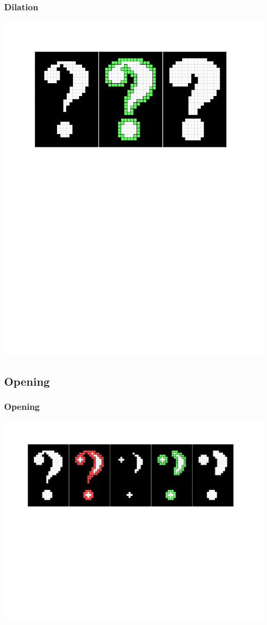 \documentclass{beamer}
\begin{document}
\begin{frame}
\frametitle{Dilation}
\includegraphics[width=1\textwidth]{dilation}
\end{frame}

\subsection[Opening]{Opening}

\begin{frame}
\frametitle{Opening}
\includegraphics[width=1\textwidth]{opening}
\end{frame}
\end{document}

